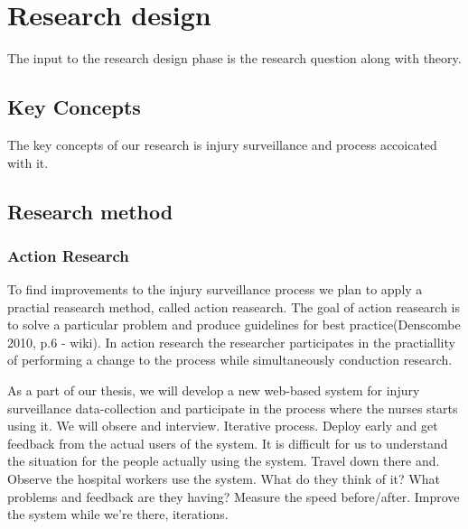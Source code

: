 \documentclass[UKenglish, 12pt]{article}
\begin{document}
\section*{Research design}
The input to the research design phase is the research question along with theory.

\subsection*{Key Concepts}
The key concepts of our research is injury surveillance and process accoicated with it.

\subsection*{Research method}
\subsubsection*{Action Research}
To find improvements to the injury surveillance process we plan to apply a practial reasearch method, called action reasearch. The goal of action reasearch is to solve a particular problem and produce guidelines for best practice(Denscombe 2010, p.6 - wiki). In action research the researcher participates in the practiallity of performing a change to the process while simultaneously conduction research.

As a part of our thesis, we will develop a new web-based system for injury surveillance data-collection and participate in the process where the nurses starts using it. We will obsere and interview. Iterative process. Deploy early and get feedback from the actual users of the system. It is difficult for us to understand the situation for the people actually using the system. Travel down there and. Observe the hospital workers use the system. What do they think of it? What problems and feedback are they having? Measure the speed before/after. Improve the system while we're there, iterations.
\end{document}

